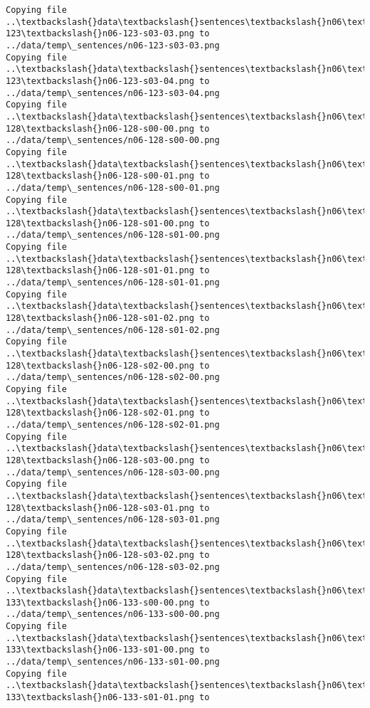 \documentclass[11pt]{article}
\begin{document}
\begin{Verbatim}[commandchars=\\\{\}]
Copying file ..\textbackslash{}data\textbackslash{}sentences\textbackslash{}n06\textbackslash{}n06-123\textbackslash{}n06-123-s03-03.png to
../data/temp\_sentences/n06-123-s03-03.png
Copying file ..\textbackslash{}data\textbackslash{}sentences\textbackslash{}n06\textbackslash{}n06-123\textbackslash{}n06-123-s03-04.png to
../data/temp\_sentences/n06-123-s03-04.png
Copying file ..\textbackslash{}data\textbackslash{}sentences\textbackslash{}n06\textbackslash{}n06-128\textbackslash{}n06-128-s00-00.png to
../data/temp\_sentences/n06-128-s00-00.png
Copying file ..\textbackslash{}data\textbackslash{}sentences\textbackslash{}n06\textbackslash{}n06-128\textbackslash{}n06-128-s00-01.png to
../data/temp\_sentences/n06-128-s00-01.png
Copying file ..\textbackslash{}data\textbackslash{}sentences\textbackslash{}n06\textbackslash{}n06-128\textbackslash{}n06-128-s01-00.png to
../data/temp\_sentences/n06-128-s01-00.png
Copying file ..\textbackslash{}data\textbackslash{}sentences\textbackslash{}n06\textbackslash{}n06-128\textbackslash{}n06-128-s01-01.png to
../data/temp\_sentences/n06-128-s01-01.png
Copying file ..\textbackslash{}data\textbackslash{}sentences\textbackslash{}n06\textbackslash{}n06-128\textbackslash{}n06-128-s01-02.png to
../data/temp\_sentences/n06-128-s01-02.png
Copying file ..\textbackslash{}data\textbackslash{}sentences\textbackslash{}n06\textbackslash{}n06-128\textbackslash{}n06-128-s02-00.png to
../data/temp\_sentences/n06-128-s02-00.png
Copying file ..\textbackslash{}data\textbackslash{}sentences\textbackslash{}n06\textbackslash{}n06-128\textbackslash{}n06-128-s02-01.png to
../data/temp\_sentences/n06-128-s02-01.png
Copying file ..\textbackslash{}data\textbackslash{}sentences\textbackslash{}n06\textbackslash{}n06-128\textbackslash{}n06-128-s03-00.png to
../data/temp\_sentences/n06-128-s03-00.png
Copying file ..\textbackslash{}data\textbackslash{}sentences\textbackslash{}n06\textbackslash{}n06-128\textbackslash{}n06-128-s03-01.png to
../data/temp\_sentences/n06-128-s03-01.png
Copying file ..\textbackslash{}data\textbackslash{}sentences\textbackslash{}n06\textbackslash{}n06-128\textbackslash{}n06-128-s03-02.png to
../data/temp\_sentences/n06-128-s03-02.png
Copying file ..\textbackslash{}data\textbackslash{}sentences\textbackslash{}n06\textbackslash{}n06-133\textbackslash{}n06-133-s00-00.png to
../data/temp\_sentences/n06-133-s00-00.png
Copying file ..\textbackslash{}data\textbackslash{}sentences\textbackslash{}n06\textbackslash{}n06-133\textbackslash{}n06-133-s01-00.png to
../data/temp\_sentences/n06-133-s01-00.png
Copying file ..\textbackslash{}data\textbackslash{}sentences\textbackslash{}n06\textbackslash{}n06-133\textbackslash{}n06-133-s01-01.png to

\end{Verbatim}
\end{document}
